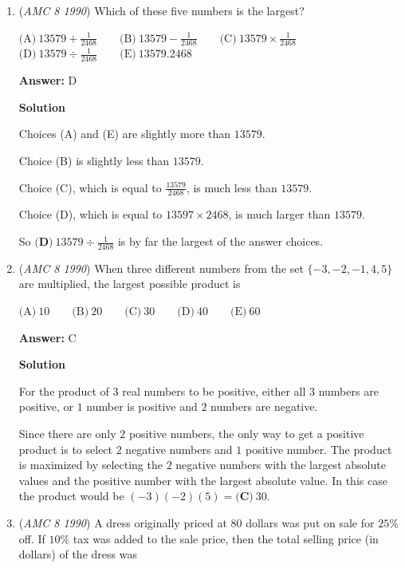 \begin{enumerate}
 


	\item (\textit{AMC 8 1990}) Which of these five numbers is the largest?


 $\text{(A)}\ 13579+\frac{1}{2468} \qquad \text{(B)}\ 13579-\frac{1}{2468} \qquad \text{(C)}\ 13579\times \frac{1}{2468}$
$\text{(D)}\ 13579\div \frac{1}{2468} \qquad \text{(E)}\ 13579.2468$

 \textbf{Answer: }D



\textbf{Solution}

Choices (A) and (E) are slightly more than $13579$.

 Choice (B) is slightly less than $13579$.

 Choice (C), which is equal to $\frac{13579}{2468}$, is much less than $13579$.

 Choice (D), which is equal to $13597 \times 2468$, is much larger than $13579$.

 So $\boxed{\textbf{(D)}\ 13579\div \frac{1}{2468}}$ is by far the largest of the answer choices.

 


	\item (\textit{AMC 8 1990}) When three different numbers from the set $\{ -3, -2, -1, 4, 5 \}$ are multiplied, the largest possible product is 


 $\text{(A)}\ 10 \qquad \text{(B)}\ 20 \qquad \text{(C)}\ 30 \qquad \text{(D)}\ 40 \qquad \text{(E)}\ 60$

 \textbf{Answer: }C



\textbf{Solution}

For the product of $3$ real numbers to be positive, either all $3$ numbers are positive, or $1$ number is positive and $2$ numbers are negative.

 Since there are only $2$ positive numbers, the only way to get a positive product is to select $2$ negative numbers and $1$ positive number.  The product is maximized by selecting the $2$ negative numbers with the largest absolute values and the positive number with the largest absolute value.  In this case the product would be $(-3)(-2)(5) = \boxed{\textbf{(C)}\ 30}$.

 


	\item (\textit{AMC 8 1990}) A dress originally priced at $80$ dollars was put on sale for $25\%$ off.  If $10\%$ tax was added to the sale price, then the total selling price (in dollars) of the dress was



\end{enumerate}
